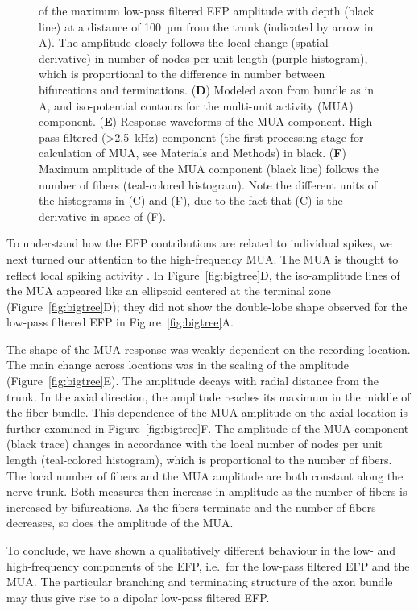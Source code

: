 \documentclass[]{elife}
\begin{document}
\begin{figure}[htbp]
{of the maximum low-pass filtered EFP amplitude with depth (black line)
at a distance of 100~µm from the trunk (indicated by arrow in A). The
amplitude closely follows the local change (spatial derivative) in
number of nodes per unit length (purple histogram), which is
proportional to the difference in number between bifurcations and
terminations. (\textbf{D}) Modeled axon from bundle as in A, and
iso-potential contours for the multi-unit activity (MUA) component.
(\textbf{E}) Response waveforms of the MUA component. High-pass filtered
(\textgreater{}2.5~kHz) component (the first processing stage for
calculation of MUA, see Materials and Methods) in black. (\textbf{F})
Maximum amplitude of the MUA component (black line) follows the number
of fibers (teal-colored histogram). Note the different units of the
histograms in (C) and (F), due to the fact that (C) is the derivative in
space of (F).}
\end{figure}

To understand how the EFP contributions are related to individual
spikes, we next turned our attention to the high-frequency MUA. The MUA
is thought to reflect local spiking activity
\citep{Stark2007Predicting}. In Figure~\ref{fig:bigtree}D, the
iso-amplitude lines of the MUA appeared like an ellipsoid centered at
the terminal zone (Figure~\ref{fig:bigtree}D); they did not show the
double-lobe shape observed for the low-pass filtered EFP in
Figure~\ref{fig:bigtree}A.

The shape of the MUA response was weakly dependent on the recording
location. The main change across locations was in the scaling of the
amplitude (Figure~\ref{fig:bigtree}E). The amplitude decays with radial
distance from the trunk. In the axial direction, the amplitude reaches
its maximum in the middle of the fiber bundle. This dependence of the
MUA amplitude on the axial location is further examined in
Figure~\ref{fig:bigtree}F. The amplitude of the MUA component (black
trace) changes in accordance with the local number of nodes per unit
length (teal-colored histogram), which is proportional to the number of
fibers. The local number of fibers and the MUA amplitude are both
constant along the nerve trunk. Both measures then increase in amplitude
as the number of fibers is increased by bifurcations. As the fibers
terminate and the number of fibers decreases, so does the amplitude of
the MUA.

To conclude, we have shown a qualitatively different behaviour in the
low- and high-frequency components of the EFP, i.e.~for the low-pass
filtered EFP and the MUA. The particular branching and terminating
structure of the axon bundle may thus give rise to a dipolar low-pass
filtered EFP.
\end{document}
